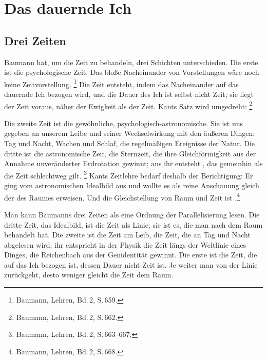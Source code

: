 \chapter{Das dauernde Ich}

\section{Drei Zeiten}

Baumann hat, um die Zeit  zu behandeln, drei Schichten unterschieden. Die erste ist die psychologische Zeit. Das bloße Nacheinander von Vorstellungen wäre noch keine Zeitvorstellung. \footnote{Baumann, Lehren, Bd.\,2, S.\,659.} Die Zeit entsteht, indem das Nacheinander auf das dauernde Ich bezogen wird, und die Dauer des Ich ist selbst nicht Zeit; sie liegt der Zeit voraus, näher der Ewigkeit als der Zeit. Kants Satz wird umgedreht: \footnote{Baumann, Lehren, Bd.\,2, S.\,662.}

Die zweite Zeit ist die gewöhnliche, psychologisch-astronomische. Sie ist uns gegeben an unserem Leibe und seiner Wechselwirkung mit den äußeren Dingen: Tag und Nacht, Wachen und Schlaf, die regelmäßigen Ereignisse der Natur. Die dritte ist die astronomische Zeit, die Sternzeit, die ihre Gleichförmigkeit aus der Annahme unveränderter Erdrotation gewinnt; aus ihr entsteht , das gemeinhin als die Zeit schlechtweg gilt. \footnote{Baumann, Lehren, Bd.\,2, S.\,663--667.} Kants Zeitlehre bedarf deshalb der Berichtigung: Er ging vom astronomischen Idealbild aus und wollte es als reine Anschauung gleich der des Raumes erweisen. Und die Gleichstellung von Raum und Zeit ist .\footnote{Baumann, Lehren, Bd.\,2, S.\,668.}

Man kann Baumanns drei Zeiten als eine Ordnung der Parallelisierung lesen. Die dritte Zeit, das Idealbild, ist die Zeit als Linie; sie ist es, die man nach dem Raum behandelt hat. Die zweite ist die Zeit am Leib, die Zeit, die an Tag und Nacht abgelesen wird; ihr entspricht in der Physik die Zeit längs der Weltlinie eines Dinges, die Reichenbach aus der Genidentität gewinnt. Die erste ist die Zeit, die auf das Ich bezogen ist, dessen Dauer nicht Zeit ist. Je weiter man von der Linie zurückgeht, desto weniger gleicht die Zeit dem Raum.


